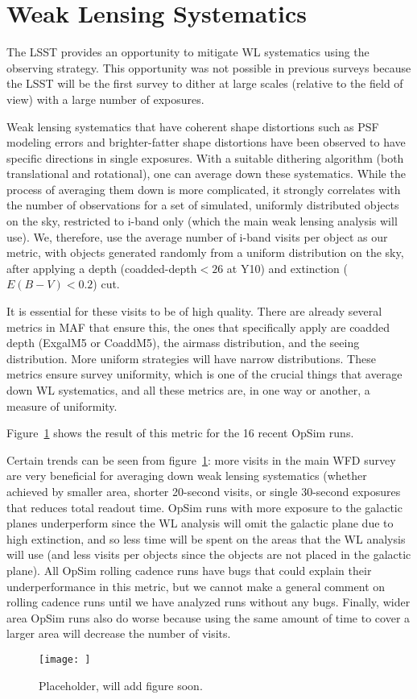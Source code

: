 \section{Weak Lensing Systematics}

The LSST provides an opportunity to mitigate WL systematics using the observing strategy. This opportunity was not possible in previous surveys because the LSST will be the first survey to dither at large scales (relative to the field of view) with a large number of exposures.

Weak lensing systematics that have coherent shape distortions such as PSF modeling errors and brighter-fatter shape distortions have been observed to have specific directions in single exposures. With a suitable dithering algorithm (both translational and rotational), one can average down these systematics. While the process of averaging them down is more complicated, it strongly correlates with the number of observations for a set of simulated, uniformly distributed objects on the sky, restricted to i-band only (which the main weak lensing analysis will use). We, therefore, use the average number of i-band visits per object as our metric, with objects generated randomly from a uniform distribution on the sky, after applying a depth (coadded-depth$<26$ at Y10) and extinction ($E(B-V)<0.2$) cut.

It is essential for these visits to be of high quality. There are already several metrics in MAF that ensure this, the ones that specifically apply are coadded depth (ExgalM5 or CoaddM5), the airmass distribution, and the seeing distribution. More uniform strategies will have narrow distributions. These metrics ensure survey uniformity, which is one of the crucial things that average down WL systematics, and all these metrics are, in one way or another, a measure of uniformity.

Figure~\ref{fig:WLSystematicsRankings} shows the result of this metric for the 16 recent OpSim runs. 

Certain trends can be seen from  figure~\ref{fig:WLSystematicsRankings}: more visits in the main WFD survey are very beneficial for averaging down weak lensing systematics (whether achieved by smaller area, shorter 20-second visits, or single 30-second exposures that reduces total readout time. OpSim runs with more exposure to the galactic planes underperform since the WL analysis will omit the galactic plane due to high extinction, and so less time will be spent on the areas that the WL analysis will use (and less visits per objects since the objects are not placed in the galactic plane). All OpSim rolling cadence runs have bugs that could explain their underperformance in this metric, but we cannot make a general comment on rolling cadence runs until we have analyzed runs without any bugs. Finally, wider area OpSim runs also do worse because using the same amount of time to cover a larger area will decrease the number of visits.

\begin{figure}[htb]
    \centering
    \caption{Placeholder, will add figure soon.}
    \label{fig:WLSystematicsRankings}
\texttt{[image: ]}
\end{figure}
